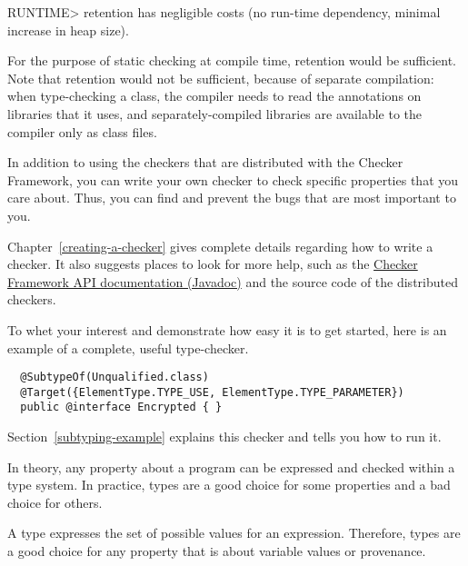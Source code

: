 \<RUNTIME> retention has negligible costs (no run-time dependency, minimal
increase in heap size).

For the purpose of static checking at compile time,
retention would be sufficient.  Note that
retention would not be sufficient, because of separate compilation: when
type-checking a class, the compiler needs to read the annotations on
libraries that it uses, and separately-compiled libraries are available to
the compiler only as class files.




In addition to using the checkers that are distributed with the Checker
Framework, you can write your own checker to check specific properties that
you care about.  Thus, you can find and prevent the bugs that are most
important to you.

Chapter~\ref{creating-a-checker} gives
complete details regarding how to write a checker.  It also suggests places
to look for more help, such as the \href{../api/}{Checker Framework
API documentation (Javadoc)} and the source code of the distributed
checkers.

To whet your interest and demonstrate how easy it is to get started, here
is an example of a complete, useful type-checker.

\begin{Verbatim}
  @SubtypeOf(Unqualified.class)
  @Target({ElementType.TYPE_USE, ElementType.TYPE_PARAMETER})
  public @interface Encrypted { }
\end{Verbatim}

Section~\ref{subtyping-example} explains this checker and tells
you how to run it.



In theory, any property about a program can be expressed and checked within
a type system.  In practice, types are a good choice for some properties
and a bad choice for others.

A type expresses the set of possible values for an expression.  Therefore,
types are a good choice for any property that is about variable values or
provenance.

